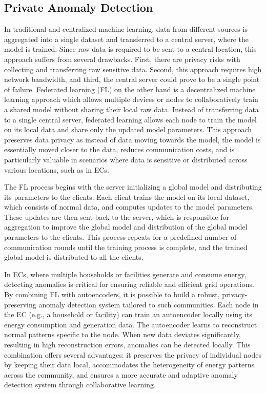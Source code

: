 \subsection{Private Anomaly Detection}

In traditional and centralized machine learning, data from different sources is aggregated into a single dataset and transferred to a central server, where the model is trained. Since raw data is required to be sent to a central location, this approach suffers from several drawbacks. First, there are privacy risks with collecting and transferring raw sensitive data. Second, this approach requires high network bandwidth, and third, the central server could prove to be a single point of failure. Federated learning (FL) on the other hand is a decentralized machine learning approach which allows multiple devices or nodes to collaboratively train a shared model without sharing their local raw data. Instead of transferring data to a single central server, federated learning allows each node to train the model on its local data and share only the updated model parameters. This approach preserves data privacy as instead of data moving towards the model, the model is essentially moved closer to the data, reduces communication costs, and is particularly valuable in scenarios where data is sensitive or distributed across various locations, such as in ECs.


The FL process begins with the server initializing a global model and distributing its parameters to the clients. Each client trains the model on its local dataset, which consists of normal data, and computes updates to the model parameters. These updates are then sent back to the server, which is responsible for aggregation to improve the global model and distribution of the global model parameters to the clients. This process repeats for a predefined number of communication rounds until the training process is complete, and the trained global model is distributed to all the clients.

In ECs, where multiple households or facilities generate and consume energy, detecting anomalies is critical for ensuring reliable and efficient grid operations. By combining FL with autoencoders, it is possible to build a robust, privacy-preserving anomaly detection system tailored to such communities. Each node in the EC (e.g., a household or facility) can train an autoencoder locally using its energy consumption and generation data. The autoencoder learns to reconstruct normal patterns specific to the node. When new data deviates significantly, resulting in high reconstruction errors, anomalies can be detected locally. This combination offers several advantages: it preserves the privacy of individual nodes by keeping their data local, accommodates the heterogeneity of energy patterns across the community, and ensures a more accurate and adaptive anomaly detection system through collaborative learning. 


